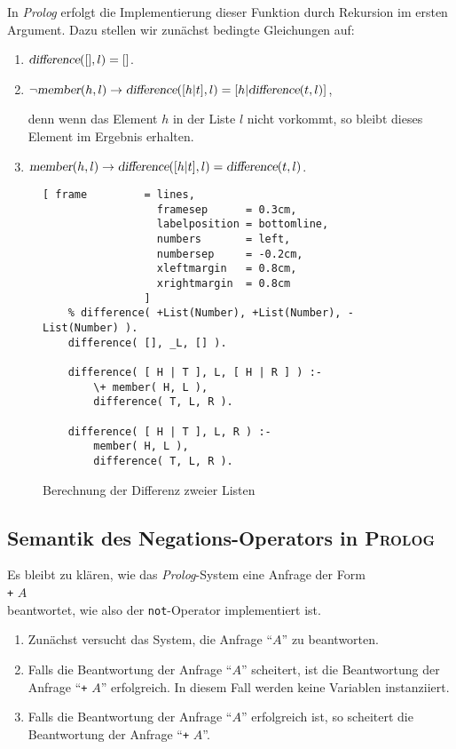 \noindent
In \textsl{Prolog} erfolgt die Implementierung dieser Funktion durch Rekursion im ersten Argument.
Dazu stellen wir zunächst bedingte Gleichungen auf:
\begin{enumerate}
\item $\textsl{difference}([], l) = []$.
\item $\neg \textsl{member}(h, l) \rightarrow \textsl{difference}([h|t], l) = [h |\textsl{difference}(t,l)]$,

      denn wenn das Element $h$ in der Liste $l$ nicht vorkommt, so bleibt dieses Element
      im Ergebnis erhalten.
\item $     \textsl{member}(h, l) \rightarrow \textsl{difference}([h|t], l) = \textsl{difference}(t,l)$.
\end{enumerate}

\begin{figure}[!h]
  \centering
\begin{Verbatim}[ frame         = lines, 
                  framesep      = 0.3cm, 
                  labelposition = bottomline,
                  numbers       = left,
                  numbersep     = -0.2cm,
                  xleftmargin   = 0.8cm,
                  xrightmargin  = 0.8cm
                ]
    % difference( +List(Number), +List(Number), -List(Number) ).
    difference( [], _L, [] ).
    
    difference( [ H | T ], L, [ H | R ] ) :-
    	\+ member( H, L ),
    	difference( T, L, R ).
    
    difference( [ H | T ], L, R ) :-
    	member( H, L ),
    	difference( T, L, R ).
\end{Verbatim}
\vspace*{-0.3cm}
  \caption{Berechnung der Differenz zweier Listen}
  \label{fig:difference}
\end{figure}

\subsection{Semantik des Negations-Operators in \textsc{Prolog}}
Es bleibt zu klären, wie das \textsl{Prolog}-System eine Anfrage der Form
\\[0.1cm]
\hspace*{1.3cm} \texttt{+} $A$ \\[0.1cm]
beantwortet, wie also der \texttt{not}-Operator implementiert ist.
\begin{enumerate}
\item Zunächst versucht das System, die Anfrage ``$A$'' zu beantworten.
\item Falls die Beantwortung der Anfrage ``$A$'' scheitert, ist die Beantwortung
      der Anfrage ``\texttt{+} $A$'' erfolgreich.  In diesem Fall werden keine
      Variablen instanziiert.
\item Falls die Beantwortung der Anfrage ``$A$'' erfolgreich ist, so scheitert die Beantwortung
      der Anfrage ``\texttt{+} $A$''.
\end{enumerate}

